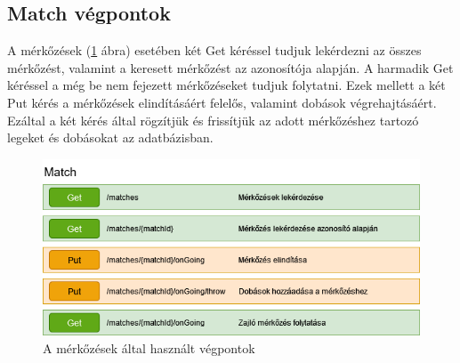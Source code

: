 \subsection{Match végpontok}
A mérkőzések (\ref{fig:matchEndpoint} ábra) esetében két Get kéréssel tudjuk lekérdezni az összes mérkőzést, valamint a keresett mérkőzést az azonosítója alapján. A harmadik Get kéréssel a még be nem fejezett mérkőzéseket tudjuk folytatni. Ezek mellett a két Put kérés a mérkőzések elindításáért felelős, valamint dobások végrehajtásáért. Ezáltal a két kérés által rögzítjük és frissítjük az adott mérkőzéshez tartozó legeket és dobásokat az adatbázisban.

\begin{figure}[h]
\centering
\includegraphics[scale=0.7]{images/Merkozes_Vegpontok.drawio.png}
\caption{A mérkőzések által használt végpontok}
\label{fig:matchEndpoint}
\end{figure}